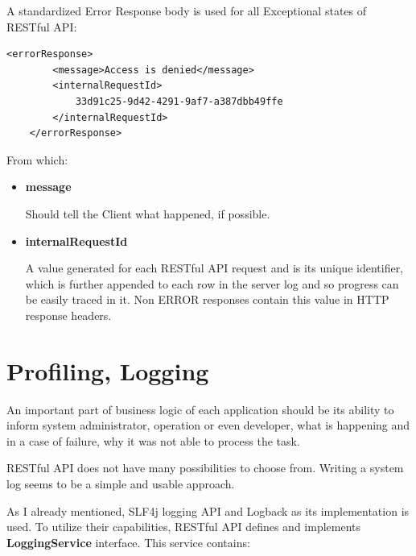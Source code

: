 	A standardized Error Response body is used for all Exceptional states of RESTful API:
	
	\begin{lstlisting}[tabsize=2]
	<errorResponse>
		<message>Access is denied</message>
		<internalRequestId>
			33d91c25-9d42-4291-9af7-a387dbb49ffe
		</internalRequestId>
	</errorResponse>
	\end{lstlisting}
	
	From which:
	
	\begin{itemize}
		\item \textbf{message}
		
		Should tell the Client what happened, if possible.
		\item \textbf{internalRequestId} 
		
		A value generated for each RESTful API request and is its unique identifier, which is further appended to each row in
		the server log and so progress can be easily traced in it.
		Non ERROR responses contain this value in HTTP response headers.
	\end{itemize}
	
	\section{Profiling, Logging}

	An important part of business logic of each application should be its ability to inform system administrator, operation
	or even developer, what is happening and in a case of failure, why it was not able to process the task.
	
	RESTful API does not have many possibilities to choose from. Writing a system log seems to be a simple and usable
	approach.
	
	As I already mentioned, SLF4j logging API and Logback as its implementation is used. To utilize their capabilities,
	RESTful API defines and implements \textbf{LoggingService} interface. This service contains:
	
